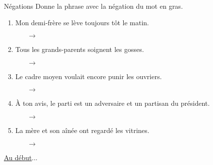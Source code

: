 \begin{frame}{Négations}
  Donne la phrase avec la négation du mot \alert{en gras}.
  \begin{enumerate}
    \item Mon demi-frère se lève \alert{toujours} tôt le matin.
    \begin{itemize}
      \item[$\to$] 
    \end{itemize}
    \item \alert{Tous les grands-parents} soignent les gosses.
    \begin{itemize}
      \item[$\to$] 
    \end{itemize}
    \item Le cadre moyen voulait \alert{encore} punir les ouvriers.
    \begin{itemize}
      \item[$\to$] 
    \end{itemize}
    \item À ton avis, le parti est \alert{un adversaire et un partisan du président}.
    \begin{itemize}
      \item[$\to$] 
    \end{itemize}
    \item La mère et son aînée ont regardé \alert{les vitrines}.
    \begin{itemize}
      \item[$\to$] 
    \end{itemize}
  \end{enumerate}
  \vspace{0.25cm}
  \raggedleft\raggedleft\hyperlink{début}{Au début}...
\end{frame}